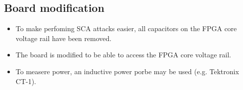 \documentclass[letterpaper,10pt,english]{sphinxmanual}
\begin{document}
\begin{sphinxVerbatim}[commandchars=\\\{\}]
\end{sphinxVerbatim}


\subsection{Board modification}
\label{\detokenize{dut_board_setup:board-modification}}\begin{itemize}
\item {} 
To make perfoming SCA attacks easier, all capacitors on the FPGA core voltage rail have been removed.

\item {} 
The board is modified to be able to access the FPGA core voltage rail.

\item {} 
To measere power, an inductive power porbe may be used (e.g. Tektronix CT-1).

\end{itemize}
\end{document}
